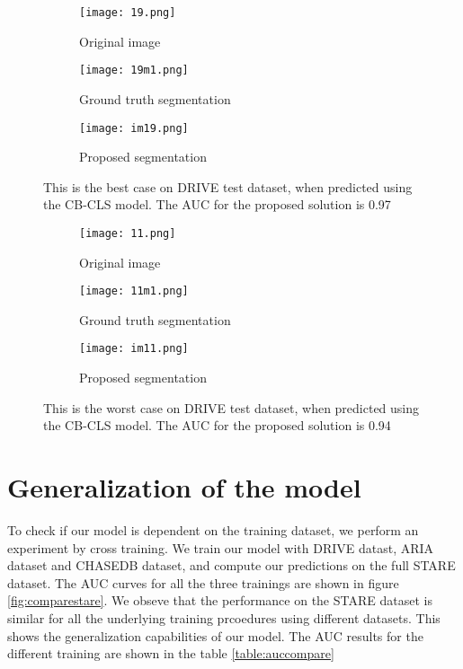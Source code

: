 \begin{figure}
	\centering
	\begin{subfigure}[b]{0.3\textwidth}
		\texttt{[image: 19.png]}
		\caption{Original image}
		\label{fig:191}
	\end{subfigure}
	\begin{subfigure}[b]{0.3\textwidth}
		\texttt{[image: 19m1.png]}
		\caption{Ground truth segmentation}
		\label{fig:192}
	\end{subfigure}
	\begin{subfigure}[b]{0.3\textwidth}
		\texttt{[image: im19.png]}
		\caption{Proposed segmentation}
		\label{fig:193}
	\end{subfigure}
	\caption[Best case on DRIVE test dataset using cluster learning]{This is the best case on DRIVE test dataset, when predicted using the CB-CLS model. The AUC for the proposed solution is 0.97}
	\label{fig:bestcase}
\end{figure}

\begin{figure}
	\centering
	\begin{subfigure}[b]{0.3\textwidth}
		\texttt{[image: 11.png]}
		\caption{Original image}
		\label{fig:111}
	\end{subfigure}
	\begin{subfigure}[b]{0.3\textwidth}
		\texttt{[image: 11m1.png]}
		\caption{Ground truth segmentation}
		\label{fig:112}
	\end{subfigure}
	\begin{subfigure}[b]{0.3\textwidth}
		\texttt{[image: im11.png]}
		\caption{Proposed segmentation}
		\label{fig:113}
	\end{subfigure}
	\caption[Worst case on DRIVE test dataset using cluster learning]{This is the worst case on DRIVE test dataset, when predicted using the CB-CLS model. The AUC for the proposed solution is 0.94}
	\label{fig:worstcase}
\end{figure}

\section{Generalization of the model}\label{sec:generalization}
To check if our model is dependent on the training dataset, we perform an experiment by cross training. We train our model with DRIVE datast, ARIA dataset and CHASEDB dataset, and compute our predictions on the full STARE dataset.
The AUC curves for all the three trainings are shown in figure \ref{fig:comparestare}. We obseve that the performance on the STARE dataset is similar for all the underlying training prcoedures using different datasets. This shows the generalization capabilities of our model. The AUC results for the different training are shown in the table \ref{table:auccompare}

